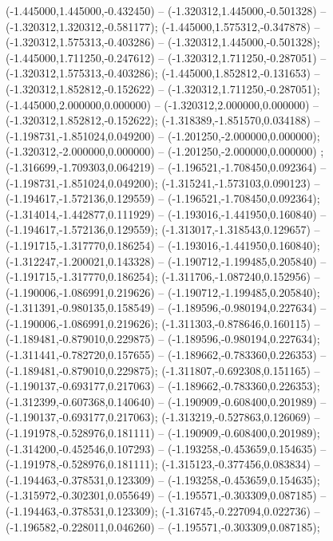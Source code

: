  (-1.445000,1.445000,-0.432450) -- (-1.320312,1.445000,-0.501328) -- (-1.320312,1.320312,-0.581177);
 (-1.445000,1.575312,-0.347878) -- (-1.320312,1.575313,-0.403286) -- (-1.320312,1.445000,-0.501328);
 (-1.445000,1.711250,-0.247612) -- (-1.320312,1.711250,-0.287051) -- (-1.320312,1.575313,-0.403286);
 (-1.445000,1.852812,-0.131653) -- (-1.320312,1.852812,-0.152622) -- (-1.320312,1.711250,-0.287051);
 (-1.445000,2.000000,0.000000) -- (-1.320312,2.000000,0.000000) -- (-1.320312,1.852812,-0.152622);
 (-1.318389,-1.851570,0.034188) -- (-1.198731,-1.851024,0.049200) -- (-1.201250,-2.000000,0.000000);
 (-1.320312,-2.000000,0.000000) -- (-1.201250,-2.000000,0.000000) ;
 (-1.316699,-1.709303,0.064219) -- (-1.196521,-1.708450,0.092364) -- (-1.198731,-1.851024,0.049200);
 (-1.315241,-1.573103,0.090123) -- (-1.194617,-1.572136,0.129559) -- (-1.196521,-1.708450,0.092364);
 (-1.314014,-1.442877,0.111929) -- (-1.193016,-1.441950,0.160840) -- (-1.194617,-1.572136,0.129559);
 (-1.313017,-1.318543,0.129657) -- (-1.191715,-1.317770,0.186254) -- (-1.193016,-1.441950,0.160840);
 (-1.312247,-1.200021,0.143328) -- (-1.190712,-1.199485,0.205840) -- (-1.191715,-1.317770,0.186254);
 (-1.311706,-1.087240,0.152956) -- (-1.190006,-1.086991,0.219626) -- (-1.190712,-1.199485,0.205840);
 (-1.311391,-0.980135,0.158549) -- (-1.189596,-0.980194,0.227634) -- (-1.190006,-1.086991,0.219626);
 (-1.311303,-0.878646,0.160115) -- (-1.189481,-0.879010,0.229875) -- (-1.189596,-0.980194,0.227634);
 (-1.311441,-0.782720,0.157655) -- (-1.189662,-0.783360,0.226353) -- (-1.189481,-0.879010,0.229875);
 (-1.311807,-0.692308,0.151165) -- (-1.190137,-0.693177,0.217063) -- (-1.189662,-0.783360,0.226353);
 (-1.312399,-0.607368,0.140640) -- (-1.190909,-0.608400,0.201989) -- (-1.190137,-0.693177,0.217063);
 (-1.313219,-0.527863,0.126069) -- (-1.191978,-0.528976,0.181111) -- (-1.190909,-0.608400,0.201989);
 (-1.314200,-0.452546,0.107293) -- (-1.193258,-0.453659,0.154635) -- (-1.191978,-0.528976,0.181111);
 (-1.315123,-0.377456,0.083834) -- (-1.194463,-0.378531,0.123309) -- (-1.193258,-0.453659,0.154635);
 (-1.315972,-0.302301,0.055649) -- (-1.195571,-0.303309,0.087185) -- (-1.194463,-0.378531,0.123309);
 (-1.316745,-0.227094,0.022736) -- (-1.196582,-0.228011,0.046260) -- (-1.195571,-0.303309,0.087185);
